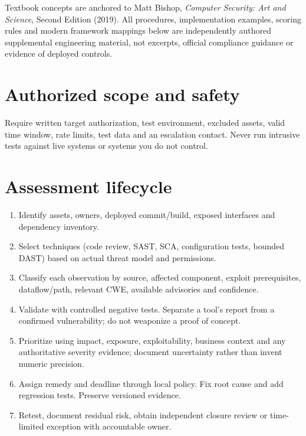 \documentclass[10pt,letterpaper]{article}
\begin{document}
\makedoctocpage
\begin{notebox}
Textbook concepts are anchored to Matt Bishop, \emph{Computer Security: Art and Science}, Second Edition (2019). All procedures, implementation examples, scoring rules and modern framework mappings below are independently authored supplemental engineering material, not excerpts, official compliance guidance or evidence of deployed controls.
\end{notebox}
\section{Authorized scope and safety}
Require written target authorization, test environment, excluded assets, valid time window, rate limits, test data and an escalation contact. Never run intrusive tests against live systems or systems you do not control.
\section{Assessment lifecycle}
\begin{enumerate}
\item Identify assets, owners, deployed commit/build, exposed interfaces and dependency inventory.
\item Select techniques (code review, SAST, SCA, configuration tests, bounded DAST) based on actual threat model and permissions.
\item Classify each observation by source, affected component, exploit prerequisites, dataflow/path, relevant CWE, available advisories and confidence.
\item Validate with controlled negative tests. Separate a tool's report from a confirmed vulnerability; do not weaponize a proof of concept.
\item Prioritize using impact, exposure, exploitability, business context and any authoritative severity evidence; document uncertainty rather than invent numeric precision.
\item Assign remedy and deadline through local policy. Fix root cause and add regression tests. Preserve versioned evidence.
\item Retest, document residual risk, obtain independent closure review or time-limited exception with accountable owner.
\end{enumerate}
\end{document}
